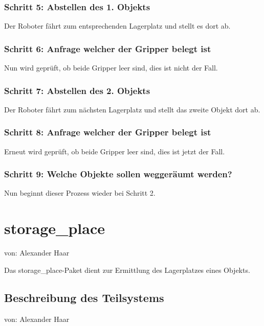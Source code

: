 \documentclass{suturo}
\makeatletter
\newcommand{\chapterauthor}[1]{%
  {\parindent0pt\vspace*{-27pt}%
  \linespread{0}\small\begin{flushright}von: #1\end{flushright}%
  \par\nobreak\vspace*{0pt}}
  \@afterheading%
}
\makeatother
\begin{document}
\subsubsection{Schritt 5: Abstellen des 1. Objekts}
Der Roboter fährt zum entsprechenden Lagerplatz und stellt es dort ab.

\subsubsection{Schritt 6: Anfrage welcher der Gripper belegt ist}
Nun wird geprüft, ob beide Gripper leer sind, dies ist nicht der Fall.

\subsubsection{Schritt 7: Abstellen des 2. Objekts}
Der Roboter fährt zum nächsten Lagerplatz und stellt das zweite Objekt dort ab.

\subsubsection{Schritt 8: Anfrage welcher der Gripper belegt ist}
Erneut wird geprüft, ob beide Gripper leer sind, dies ist jetzt der Fall.

\subsubsection{Schritt 9: Welche Objekte sollen weggeräumt werden?}
Nun beginnt dieser Prozess wieder bei Schritt 2.


\section{storage\_place}
\chapterauthor{Alexander Haar}
Das storage\_place-Paket dient zur Ermittlung des Lagerplatzes eines Objekts.

\begin{figure}[!htb]
\end{figure}
      
\subsection{Beschreibung des Teilsystems}
\chapterauthor{Alexander Haar}
\end{document}
